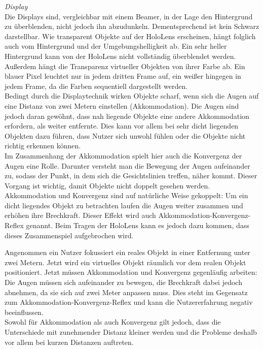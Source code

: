 \textit{Display}\\
Die Displays sind, vergleichbar mit einem Beamer, in der Lage den Hintergrund zu überblenden, nicht jedoch ihn abzudunkeln. Dementsprechend ist kein Schwarz darstellbar. Wie transparent Objekte auf der HoloLens erscheinen, hängt folglich auch vom Hintergrund und der Umgebungshelligkeit ab. Ein sehr heller Hintergrund kann von der HoloLens nicht vollständig überblendet werden.\\
\noindent\hspace*{5mm}
Außerdem hängt die Transparenz virtueller Objekten von ihrer Farbe ab. Ein blauer Pixel leuchtet nur in jedem dritten Frame auf, ein weißer hingegen in jedem Frame, da die Farben sequentiell dargestellt werden.\\

Bedingt durch die Displaytechnik wirken Objekte scharf, wenn sich die Augen auf eine Distanz von zwei Metern einstellen (Akkommodation). Die Augen sind jedoch daran gewöhnt, dass nah liegende Objekte eine andere Akkommodation erfordern, als weiter entfernte. Dies kann vor allem bei sehr dicht liegenden Objekten dazu führen, dass Nutzer sich unwohl fühlen oder die Objekte nicht richtig erkennen können.\\
\noindent\hspace*{5mm}
Im Zusammenhang der Akkommodation spielt hier auch die Konvergenz der Augen eine Rolle. Darunter versteht man die Bewegung der Augen aufeinander zu, sodass der Punkt, in dem sich die Gesichtslinien treffen, näher kommt. Dieser Vorgang ist wichtig, damit Objekte nicht doppelt gesehen werden. Akkommodation und Konvergenz sind auf natürliche Weise gekoppelt: Um ein dicht liegendes Objekt zu betrachten laufen die Augen weiter zusammen und erhöhen ihre Brechkraft. Dieser Effekt wird auch Akkommodation-Konvergenz-Reflex genannt. Beim Tragen der HoloLens kann es jedoch dazu kommen, dass dieses Zusammenspiel aufgebrochen wird.
\par
\noindent\hspace*{5mm}
Angenommen ein Nutzer fokussiert ein reales Objekt in einer Entfernung unter zwei Metern. Jetzt wird ein virtuelles Objekt räumlich vor dem realen Objekt positioniert. Jetzt müssen Akkommodation und Konvergenz gegenläufig arbeiten: Die Augen müssen sich aufeinander zu bewegen, die Brechkraft dabei jedoch abnehmen, da sie sich auf zwei Meter anpassen muss. Dies steht im Gegensatz zum Akkommodation-Konvergenz-Reflex und kann die Nutzererfahrung negativ beeinflussen.\\
\noindent\hspace*{5mm}
Sowohl für Akkommodation als auch Konvergenz gilt jedoch, dass die Unterschiede mit zunehmender Distanz kleiner werden und die Probleme deshalb vor allem bei kurzen Distanzen auftreten.\\

